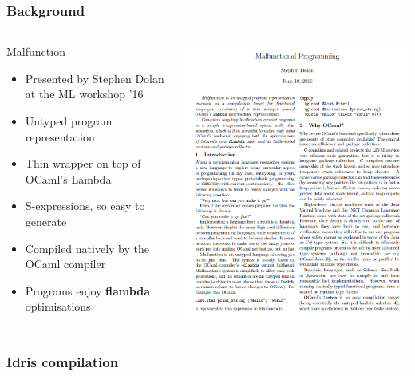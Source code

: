 \documentclass[aspectratio=169]{beamer}
\begin{document}
\begin{frame}[t]
  \frametitle{Background}
  \begin{columns}[c]
    \begin{block}{Malfunction}
      \begin{itemize}
        \item Presented by Stephen Dolan at the ML workshop '16
        \item Untyped program representation
        \item Thin wrapper on top of OCaml's Lambda
        \item S-expressions, so easy to generate
        \item Compiled natively by the OCaml compiler
        \item Programs enjoy \textbf{flambda} optimisations
      \end{itemize}
    \end{block}
    \includegraphics[width=.5\textwidth]{mlfpaper.png}
  \end{columns}
\end{frame}

\begin{frame}
  \frametitle{Idris compilation}


  \centering
  \smartdiagramset{
    back arrow disabled=true,
  }
\end{frame}
\end{document}
